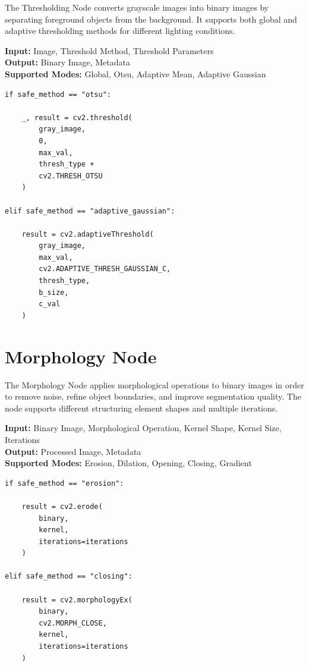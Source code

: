 \documentclass[a4paper,12pt]{report}
\begin{document}
The Thresholding Node converts grayscale images into binary images by
separating foreground objects from the background. It supports both
global and adaptive thresholding methods for different lighting
conditions.

\noindent \textbf{Input:} Image, Threshold Method, Threshold Parameters \\
\textbf{Output:} Binary Image, Metadata \\
\textbf{Supported Modes:} Global, Otsu, Adaptive Mean, Adaptive Gaussian

\begin{lstlisting}[caption={Core Algorithm}, label={lst:thresholding-node}]
if safe_method == "otsu":

    _, result = cv2.threshold(
        gray_image,
        0,
        max_val,
        thresh_type +
        cv2.THRESH_OTSU
    )

elif safe_method == "adaptive_gaussian":

    result = cv2.adaptiveThreshold(
        gray_image,
        max_val,
        cv2.ADAPTIVE_THRESH_GAUSSIAN_C,
        thresh_type,
        b_size,
        c_val
    )
\end{lstlisting}

\section{Morphology Node}
\label{sec:morphology-node}

The Morphology Node applies morphological operations to binary images in
order to remove noise, refine object boundaries, and improve segmentation
quality. The node supports different structuring element shapes and
multiple iterations.

\noindent \textbf{Input:} Binary Image, Morphological Operation, Kernel Shape, Kernel Size, Iterations \\
\textbf{Output:} Processed Image, Metadata \\
\textbf{Supported Modes:} Erosion, Dilation, Opening, Closing, Gradient

\begin{lstlisting}[caption={Core Algorithm}, label={lst:morphology-node}]
if safe_method == "erosion":

    result = cv2.erode(
        binary,
        kernel,
        iterations=iterations
    )

elif safe_method == "closing":

    result = cv2.morphologyEx(
        binary,
        cv2.MORPH_CLOSE,
        kernel,
        iterations=iterations
    )
\end{lstlisting}
\end{document}
